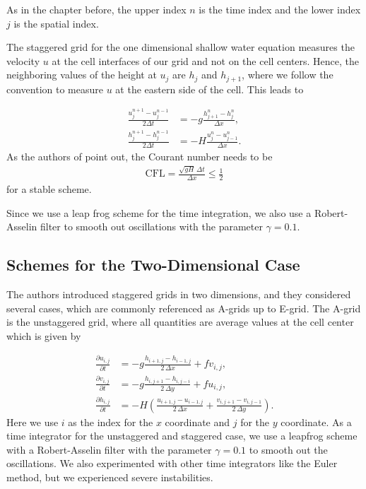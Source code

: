 As in the chapter before, the upper index $n$ is the time index and the lower index $j$ is the spatial
index. 


The staggered grid for the one dimensional shallow water equation measures the velocity $u$ at the
cell interfaces of our grid and not on the cell centers. Hence, the neighboring values of the height
at $u_j$ are $h_j$ and $h_{j+1}$, where we follow the convention to measure $u$ at the eastern side
of the cell. This leads to 

\begin{align*}
    \frac{u^{n+1}_j - u_j^{n-1}}{2\Delta t} &= - g \frac{h_{j+1}^n - h_j^n}{\Delta x}, \\[1em]
    \frac{h_j^{n+1} - h_{j}^{n-1}}{2\Delta t} &= -H \frac{u_j^n - u^n_{j-1}}{\Delta x}.
\end{align*}
As the authors of \cite{Doos2022} point out, the Courant number needs to be
\begin{align*}
    \mathrm{CFL} = \frac{\sqrt{gH}\, \Delta t}{\Delta x} \leq \frac{1}{2}
\end{align*}
for a stable scheme.

Since we use a leap frog scheme for the time integration, we also use a Robert-Asselin filter
to smooth out oscillations with the parameter $\gamma = 0.1$.

\subsection{Schemes for the Two-Dimensional Case}
The authors \cite{Arakawa1977} introduced staggered grids in two dimensions, and they considered several
cases, which are commonly referenced as A-grids up to E-grid. The A-grid is the unstaggered grid,
where all quantities are average values at the cell center which is given by

\begin{align}
    \label{eq:Agrid}
    \frac{\partial u_{i,j}}{\partial t} &= -g \frac{h_{i+1,j} - h_{i-1, j}}{2\, \Delta x} + f v_{i, j}, \\[1em]
    \frac{\partial v_{i,j}}{\partial t} &= -g \frac{h_{i,j+1} - h_{i, j-i}}{2\, \Delta y} + f u_{i,j}, \\[1em]
    \frac{\partial h_{i,j}}{\partial t} &= -H\left(\frac{u_{i+1,j} - u_{i-1,j}}{2\, \Delta x} + \frac{v_{i,j+1} - v_{i, j-1}}{2\, \Delta y}\right).
\end{align}
Here we use $i$ as the index for the $x$ coordinate and $j$ for the $y$ coordinate. As a time 
integrator for the unstaggered and staggered case,  we use a leapfrog scheme with a Robert-Asselin 
filter with the parameter
$\gamma = 0.1$ to smooth out the oscillations. We also experimented with other time integrators like
the Euler method, but we experienced severe instabilities. 

